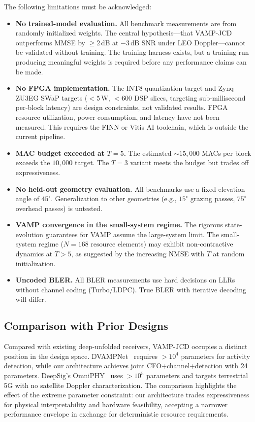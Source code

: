 \documentclass{article}
\begin{document}
The following limitations must be acknowledged:

\begin{itemize}
  \item \textbf{No trained-model evaluation.} All benchmark measurements are from randomly initialized weights. The central hypothesis---that VAMP-JCD outperforms MMSE by $\geq 2$\,dB at $-3$\,dB SNR under LEO Doppler---cannot be validated without training. The training harness exists, but a training run producing meaningful weights is required before any performance claims can be made.
  \item \textbf{No FPGA implementation.} The INT8 quantization target and Zynq ZU3EG SWaP targets ($<5$\,W, $<600$ DSP slices, targeting sub-millisecond per-block latency) are design constraints, not validated results. FPGA resource utilization, power consumption, and latency have not been measured. This requires the FINN or Vitis AI toolchain, which is outside the current pipeline.
  \item \textbf{MAC budget exceeded at $T=5$.} The estimated $\sim 15{,}000$ MACs per block exceeds the $10{,}000$ target. The $T=3$ variant meets the budget but trades off expressiveness.
  \item \textbf{No held-out geometry evaluation.} All benchmarks use a fixed elevation angle of $45^\circ$. Generalization to other geometries (e.g., $15^\circ$ grazing passes, $75^\circ$ overhead passes) is untested.
  \item \textbf{VAMP convergence in the small-system regime.} The rigorous state-evolution guarantees for VAMP assume the large-system limit. The small-system regime ($N=168$ resource elements) may exhibit non-contractive dynamics at $T > 5$, as suggested by the increasing NMSE with $T$ at random initialization.
  \item \textbf{Uncoded BLER.} All BLER measurements use hard decisions on LLRs without channel coding (Turbo/LDPC). True BLER with iterative decoding will differ.
\end{itemize}

\subsection{Comparison with Prior Designs}

Compared with existing deep-unfolded receivers, VAMP-JCD occupies a distinct position in the design space. DVAMPNet~\cite{hou2025dvampnet} requires $> 10^4$ parameters for activity detection, while our architecture achieves joint CFO+channel+detection with 24 parameters. DeepSig's OmniPHY~\cite{deepsig2024} uses $> 10^5$ parameters and targets terrestrial 5G with no satellite Doppler characterization. The comparison highlights the effect of the extreme parameter constraint: our architecture trades expressiveness for physical interpretability and hardware feasibility, accepting a narrower performance envelope in exchange for deterministic resource requirements.
\end{document}

